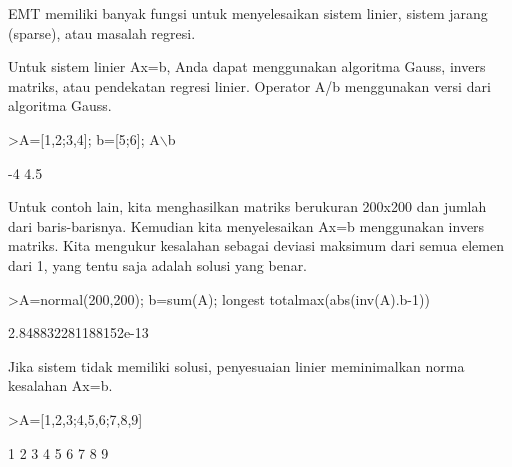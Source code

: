\documentclass[a4paper,10pt]{article}
\begin{document}
\begin{eulernotebook}
\begin{eulercomment}
\begin{eulercomment}
\begin{eulercomment}
\begin{eulercomment}
\begin{eulercomment}
\begin{eulercomment}
\begin{eulercomment}
\begin{eulercomment}
\begin{eulercomment}
\begin{eulercomment}
\begin{eulercomment}
\begin{eulercomment}
\begin{eulercomment}
\begin{eulercomment}
\begin{eulercomment}
\begin{eulercomment}
\begin{eulercomment}
\begin{eulercomment}
\begin{eulercomment}
\begin{eulercomment}
\begin{eulercomment}
\begin{eulercomment}
\begin{eulercomment}
\begin{eulercomment}
\begin{euleroutput}
\end{euleroutput}
\begin{eulercomment}
\begin{eulercomment}
\begin{eulercomment}
EMT memiliki banyak fungsi untuk menyelesaikan sistem linier, sistem
jarang (sparse), atau masalah regresi.

Untuk sistem linier Ax=b, Anda dapat menggunakan algoritma Gauss,
invers matriks, atau pendekatan regresi linier. Operator A/b
menggunakan versi dari algoritma Gauss.
\end{eulercomment}
\begin{eulerprompt}
>A=[1,2;3,4]; b=[5;6]; A\(\backslash\)b
\end{eulerprompt}
\begin{euleroutput}
             -4 
            4.5 
\end{euleroutput}
\begin{eulercomment}
Untuk contoh lain, kita menghasilkan matriks berukuran 200x200 dan
jumlah dari baris-barisnya. Kemudian kita menyelesaikan Ax=b
menggunakan invers matriks. Kita mengukur kesalahan sebagai deviasi
maksimum dari semua elemen dari 1, yang tentu saja adalah solusi yang
benar.
\end{eulercomment}
\begin{eulerprompt}
>A=normal(200,200); b=sum(A); longest totalmax(abs(inv(A).b-1))
\end{eulerprompt}
\begin{euleroutput}
    2.848832281188152e-13 
\end{euleroutput}
\begin{eulercomment}
Jika sistem tidak memiliki solusi, penyesuaian linier meminimalkan
norma kesalahan Ax=b.
\end{eulercomment}
\begin{eulerprompt}
>A=[1,2,3;4,5,6;7,8,9]
\end{eulerprompt}
\begin{euleroutput}
              1             2             3 
              4             5             6 
              7             8             9 
\end{euleroutput}

\end{eulercomment}
\end{eulercomment}
\end{eulercomment}
\end{eulercomment}
\end{eulercomment}
\end{eulercomment}
\end{eulercomment}
\end{eulercomment}
\end{eulercomment}
\end{eulercomment}
\end{eulercomment}
\end{eulercomment}
\end{eulercomment}
\end{eulercomment}
\end{eulercomment}
\end{eulercomment}
\end{eulercomment}
\end{eulercomment}
\end{eulercomment}
\end{eulercomment}
\end{eulercomment}
\end{eulercomment}
\end{eulercomment}
\end{eulercomment}
\end{eulercomment}
\end{eulercomment}
\end{eulernotebook}
\end{document}

